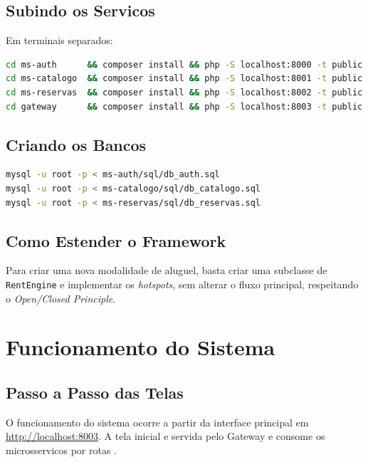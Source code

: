 \documentclass[12pt,a4paper]{article}
\begin{document}
\subsection{Subindo os Servicos}
Em terminais separados:
\begin{lstlisting}[language=bash]
cd ms-auth      && composer install && php -S localhost:8000 -t public
cd ms-catalogo  && composer install && php -S localhost:8001 -t public
cd ms-reservas  && composer install && php -S localhost:8002 -t public
cd gateway      && composer install && php -S localhost:8003 -t public
\end{lstlisting}

\subsection{Criando os Bancos}
\begin{lstlisting}[language=bash]
mysql -u root -p < ms-auth/sql/db_auth.sql
mysql -u root -p < ms-catalogo/sql/db_catalogo.sql
mysql -u root -p < ms-reservas/sql/db_reservas.sql
\end{lstlisting}

\subsection{Como Estender o Framework}
Para criar uma nova modalidade de aluguel, basta criar uma subclasse de
\texttt{RentEngine} e implementar os \textit{hotspots}, sem alterar o fluxo principal,
respeitando o \textit{Open/Closed Principle}.

\section{Funcionamento do Sistema}
\subsection{Passo a Passo das Telas}
O funcionamento do sistema ocorre a partir da interface principal em
\url{http://localhost:8003}. A tela inicial e servida pelo Gateway e consome os
microsservicos por rotas .
\end{document}
